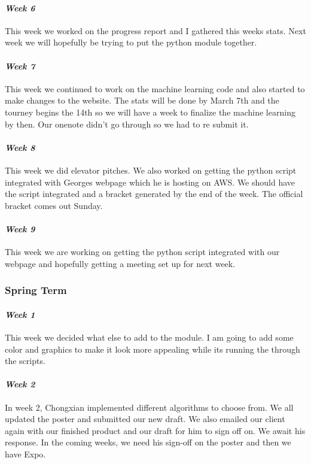 \documentclass[onecolumn, draftclsnofoot,10pt, compsoc]{IEEEtran}
\begin{document}
\paragraph{\emph{Week 6}}
This week we worked on the progress report and I gathered this weeks stats. Next week we will hopefully be trying to put the python module together.
\paragraph{\emph{Week 7}}
This week we continued to work on the machine learning code and also started to make changes to the website. The stats will be done by March 7th and the tourney begins the 14th so we will have a week to finalize the machine learning by then. Our onenote didn't go through so we had to re submit it.
\paragraph{\emph{Week 8}}
This week we did elevator pitches. We also worked on getting the python script integrated with Georges webpage which he is hosting on AWS. We should have the script integrated and a bracket generated by the end of the week. The official bracket comes out Sunday.
\paragraph{\emph{Week 9}}
This week we are working on getting the python script integrated with our webpage and hopefully getting a meeting set up for next week.


\subsubsection{Spring Term}
\paragraph{\emph{Week 1}}
This week we decided what else to add to the module. I am going to add some color and graphics to make it look more appealing while its running the through the scripts.
\paragraph{\emph{Week 2}}
In week 2, Chongxian implemented different algorithms to choose from. We all updated the poster and submitted our new draft. We also emailed our client again with our finished product and our draft for him to sign off on. We await his response. In the coming weeks, we need his sign-off on the poster and then we have Expo.
\end{document}
